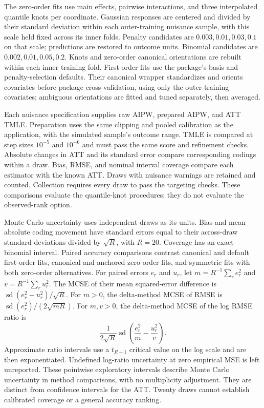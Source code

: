 \documentclass[11pt]{article}
\theoremstyle{definition}
\theoremstyle{remark}
\begin{document}
The zero-order fits use main effects, pairwise interactions, and three
interpolated quantile knots per coordinate. Gaussian responses are centered
and divided by their standard deviation within each outer-training nuisance
sample, with this scale held fixed across its inner folds. Penalty candidates
are $0.003,0.01,0.03,0.1$ on that scale; predictions are restored to outcome
units. Binomial candidates are $0.002,0.01,0.05,0.2$. Knots and zero-order
canonical orientations are rebuilt within each inner training fold.
First-order fits use the package's basis and penalty-selection defaults.
Their canonical wrapper standardizes and orients covariates before package
cross-validation, using only the outer-training covariates; ambiguous
orientations are fitted and tuned separately, then averaged.

Each nuisance specification supplies raw AIPW, prepared AIPW, and ATT TMLE.
Preparation uses the same clipping and pooled calibration as the application,
with the simulated sample's outcome range. TMLE is compared at step sizes
$10^{-5}$ and $10^{-6}$ and must pass the same score and refinement checks.
Absolute changes in ATT and its standard error compare corresponding
codings within a draw. Bias, RMSE, and nominal interval coverage compare
each estimator with the known ATT. Draws with nuisance warnings are retained
and counted. Collection requires every draw to pass the targeting checks.
These comparisons evaluate
the quantile-knot procedures; they do not evaluate the observed-rank option.

Monte Carlo uncertainty uses independent draws as its units. Bias and mean
absolute coding movement have standard errors equal to their across-draw
standard deviations divided by $\sqrt R$, with $R=20$. Coverage has an exact
binomial interval. Paired accuracy comparisons contrast canonical and default
first-order fits, canonical and anchored zero-order fits, and symmetric fits
with both zero-order alternatives. For paired errors $e_r$ and $u_r$, let
$m=R^{-1}\sum_r e_r^2$ and $v=R^{-1}\sum_r u_r^2$. The MCSE of their mean
squared-error difference is $\operatorname{sd}(e_r^2-u_r^2)/\sqrt R$.
For $m>0$, the delta-method MCSE of RMSE is
$\operatorname{sd}(e_r^2)/(2\sqrt{mR})$.
For $m,v>0$, the delta-method MCSE of the log RMSE ratio is
\[
 \frac{1}{2\sqrt R}\operatorname{sd}
 \left(\frac{e_r^2}{m}-\frac{u_r^2}{v}\right).
\]
Approximate ratio intervals use a $t_{R-1}$ critical value on the log scale
and are then exponentiated. Undefined log-ratio uncertainty at zero empirical
MSE is left unreported. These pointwise exploratory intervals describe
Monte Carlo uncertainty in method comparisons, with no multiplicity
adjustment. They are distinct from confidence intervals for the ATT.
Twenty draws cannot establish
calibrated coverage or a general accuracy ranking.
\end{document}
